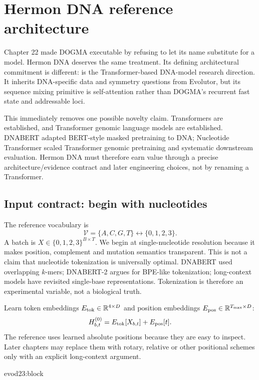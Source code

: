 \chapter{Hermon DNA reference architecture}

Chapter 22 made DOGMA executable by refusing to let its name substitute for a model.
Hermon DNA deserves the same treatment. Its defining architectural commitment is
different:  is the Transformer-based DNA-model research direction.
It inherits DNA-specific data and symmetry questions from Evolutor, but its sequence
mixing primitive is self-attention rather than DOGMA's recurrent fast state and
addressable loci.

This immediately removes one possible novelty claim. Transformers are established,
and Transformer genomic language models are established. DNABERT adapted BERT-style
masked pretraining to DNA; Nucleotide Transformer scaled Transformer genomic
pretraining and systematic downstream evaluation. \cite{dnabert2021,nt2025}
Hermon DNA must therefore earn value through a precise architecture/evidence
contract and later engineering choices, not by renaming a Transformer.

\section{Input contract: begin with nucleotides}

The reference vocabulary is
\[
\mathcal V=\{A,C,G,T\}\leftrightarrow\{0,1,2,3\}.
\]
A batch is $X\in\{0,1,2,3\}^{B\times T}$. We begin at single-nucleotide resolution
because it makes position, complement and mutation semantics transparent. This is
not a claim that nucleotide tokenization is universally optimal. DNABERT used
overlapping $k$-mers; DNABERT-2 argues for BPE-like tokenization; long-context models
have revisited single-base representations. Tokenization is therefore an experimental
variable, not a biological truth. \cite{dnabert2,hyenadna}

Learn token embeddings $E_{\rm tok}\in\mathbb R^{4\times D}$ and position embeddings
$E_{\rm pos}\in\mathbb R^{T_{\max}\times D}$:
\[
H^{(0)}_{b,t}=E_{\rm tok}[X_{b,t}]+E_{\rm pos}[t].
\]
The reference uses learned absolute positions because they are easy to inspect.
Later chapters may replace them with rotary, relative or other positional schemes
only with an explicit long-context argument.

{evod23:block}


